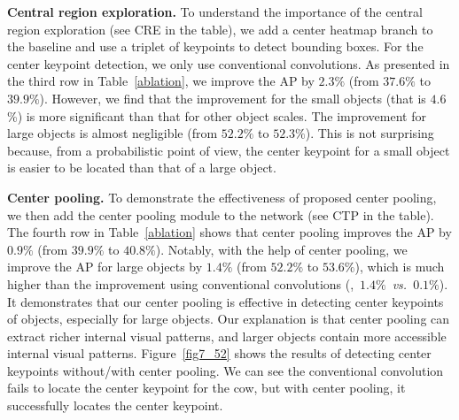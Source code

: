 \documentclass[10pt,twocolumn,letterpaper]{article}
\begin{document}
\vspace{1ex}\noindent\textbf{Central region exploration.} To understand the importance of the central region exploration (see CRE in the table), we add a center heatmap branch to the baseline and use a triplet of keypoints to detect bounding boxes. For the center keypoint detection, we only use conventional convolutions. As presented in the third row in Table~\ref{ablation}, we improve the AP by $2.3\%$ (from $37.6\%$ to $39.9\%$). However, we find that the improvement for the small objects (that is $4.6$\%) is more significant than that for other object scales. The improvement for large objects is almost negligible (from $52.2\%$ to $52.3\%$). This is not surprising because, from a probabilistic point of view, the center keypoint for a small object is easier to be located than that of a large object. 

\vspace{1ex}\noindent\textbf{Center pooling.} To demonstrate the effectiveness of proposed center pooling, we then add the center pooling module to the network (see CTP in the table). The fourth row in Table~\ref{ablation} shows that center pooling improves the AP by $0.9\%$ (from $39.9\%$ to $40.8\%$). Notably, with the help of center pooling, we improve the AP for large objects by $1.4\%$ (from $52.2\%$ to $53.6\%$), which is much higher than the improvement using conventional convolutions (\ie,~$1.4\%$~\emph{vs.}~$0.1\%$). It demonstrates that our center pooling is effective in detecting center keypoints of objects, especially for large objects. Our explanation is that center pooling can extract richer internal visual patterns, and larger objects contain more accessible internal visual patterns. Figure~\ref{fig7_52} shows the results of detecting center keypoints without/with center pooling. We can see the conventional convolution fails to locate the center keypoint for the cow, but with center pooling, it successfully locates the center keypoint.
\begin{table}[!tb]
\small
\centering
{}
\vspace{-2ex}
\caption{Error analysis of center keypoints via using ground-truth. we replace the predicted center keypoints with the ground-truth values, the results suggest there is still room for improvement in detecting center keypoints.}
\label{Error}
\vspace{-2ex}
\end{table}
\end{document}
